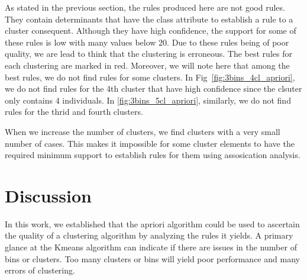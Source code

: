 \documentclass[letterpaper,12pt]{article}
\begin{document}
As stated in the previous section, the rules produced here are not good rules. They contain determinants that have the class attribute to establish a rule to a cluster consequent. Although they have high confidence, the support for some of these rules is low with many values below 20. Due to these rules being of poor quality, we are lead to think that the clustering is erroneous. The best rules for each clustering are marked in red. Moreover, we will note here that among the best rules, we do not find rules for some clusters. In Fig~\ref{fig:3bins_4cl_apriori}, we do not find rules for the 4th cluster that have high confidence since the clsuter only contains 4 individuals. In \ref{fig:3bins_5cl_apriori}, similarly, we do not find rules for the thrid and fourth clusters.

When we increase the number of clusters, we find clusters with a very small number of cases. This makes it impossible for some cluster elements to have the required minimum support to establish rules for them using assosication analysis.


\section{Discussion}

In this work, we established that the apriori algorithm could be used to ascertain the quality of a clustering algorithm by analyzing the rules it yields. A primary glance at the Kmeans algorithm can indicate if there are issues in the number of bins or clusters. Too many clusters or bins will yield poor performance and many errors of clustering.
\end{document}
